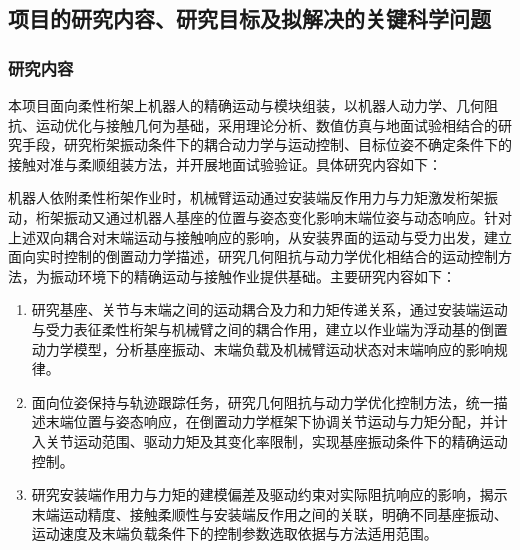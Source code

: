 \subsection{项目的研究内容、研究目标及拟解决的关键科学问题}

\subsubsection{研究内容}

本项目面向柔性桁架上机器人的精确运动与模块组装，以机器人动力学、几何阻抗、运动优化与接触几何为基础，采用理论分析、数值仿真与地面试验相结合的研究手段，研究桁架振动条件下的耦合动力学与运动控制、目标位姿不确定条件下的接触对准与柔顺组装方法，并开展地面试验验证。具体研究内容如下：


机器人依附柔性桁架作业时，机械臂运动通过安装端反作用力与力矩激发桁架振动，桁架振动又通过机器人基座的位置与姿态变化影响末端位姿与动态响应。针对上述双向耦合对末端运动与接触响应的影响，从安装界面的运动与受力出发，建立面向实时控制的倒置动力学描述，研究几何阻抗与动力学优化相结合的运动控制方法，为振动环境下的精确运动与接触作业提供基础。主要研究内容如下：
\begin{enumerate}[label=\arabic*)]
 \item 研究基座、关节与末端之间的运动耦合及力和力矩传递关系，通过安装端运动与受力表征柔性桁架与机械臂之间的耦合作用，建立以作业端为浮动基的倒置动力学模型，分析基座振动、末端负载及机械臂运动状态对末端响应的影响规律。
 \item 面向位姿保持与轨迹跟踪任务，研究几何阻抗与动力学优化控制方法，统一描述末端位置与姿态响应，在倒置动力学框架下协调关节运动与力矩分配，并计入关节运动范围、驱动力矩及其变化率限制，实现基座振动条件下的精确运动控制。
 \item 研究安装端作用力与力矩的建模偏差及驱动约束对实际阻抗响应的影响，揭示末端运动精度、接触柔顺性与安装端反作用之间的关联，明确不同基座振动、运动速度及末端负载条件下的控制参数选取依据与方法适用范围。
\end{enumerate}


